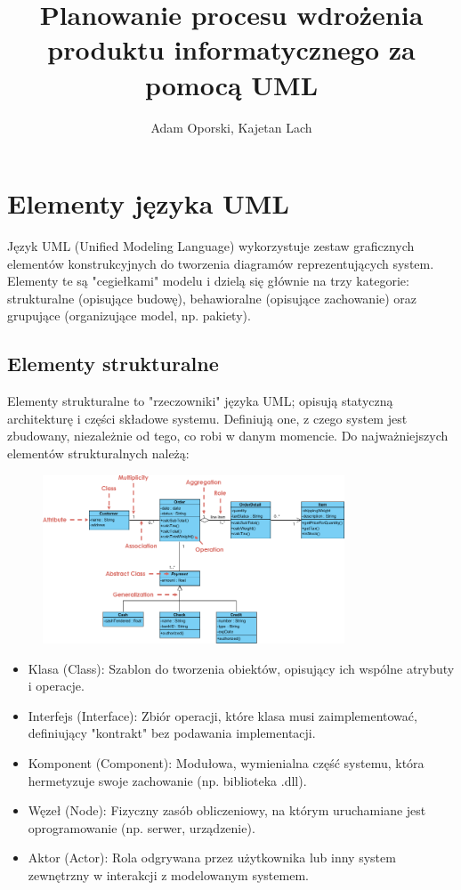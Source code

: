 \documentclass[a4paper,12pt]{article}
\title{Planowanie procesu wdrożenia produktu informatycznego za pomocą UML}
\author{Adam Oporski, Kajetan Lach}
\begin{document}
\maketitle

\tableofcontents

\section{Elementy języka UML}
Język UML (Unified Modeling Language) wykorzystuje zestaw graficznych elementów konstrukcyjnych do tworzenia diagramów reprezentujących system. Elementy te są "cegiełkami" modelu i dzielą się głównie na trzy kategorie: strukturalne (opisujące budowę), behawioralne (opisujące zachowanie) oraz grupujące (organizujące model, np. pakiety).

\subsection{Elementy strukturalne}
Elementy strukturalne to "rzeczowniki" języka UML; opisują statyczną architekturę i części składowe systemu. Definiują one, z czego system jest zbudowany, niezależnie od tego, co robi w danym momencie. Do najważniejszych elementów strukturalnych należą:

\begin{figure}[h!]
    \centering
    \includegraphics[width=0.8\textwidth]{img/17-class-diagram-example-order-system.png}
\end{figure}

\begin{itemize}
\item Klasa (Class): Szablon do tworzenia obiektów, opisujący ich wspólne atrybuty i operacje.
\item Interfejs (Interface): Zbiór operacji, które klasa musi zaimplementować, definiujący "kontrakt" bez podawania implementacji.
\item Komponent (Component): Modułowa, wymienialna część systemu, która hermetyzuje swoje zachowanie (np. biblioteka .dll).
\item Węzeł (Node): Fizyczny zasób obliczeniowy, na którym uruchamiane jest oprogramowanie (np. serwer, urządzenie).
\item Aktor (Actor): Rola odgrywana przez użytkownika lub inny system zewnętrzny w interakcji z modelowanym systemem.
\end{itemize}
\end{document}
